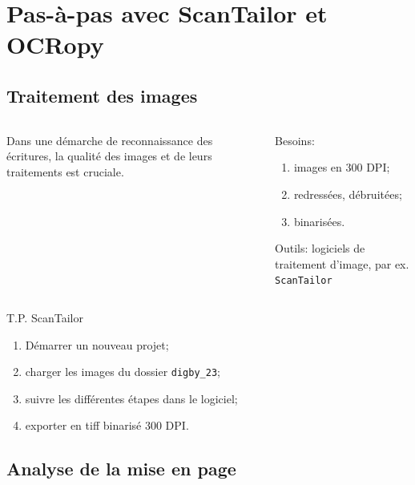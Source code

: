 \documentclass[ignorenonframetext]{beamer}
\begin{document}
\section{Pas-à-pas avec ScanTailor et OCRopy}

\subsection{Traitement des images}

\begin{frame}{}
\begin{columns}
\begin{column}{0.45\textwidth}
Dans une démarche de reconnaissance des écritures, la qualité des images
et de leurs traitements est cruciale.
\end{column}
\begin{column}{0.45\textwidth}
Besoins:
\begin{enumerate}
\item images en 300 DPI;
\item redressées, débruitées;
\item binarisées.
\end{enumerate}
Outils: logiciels de traitement d'image, par ex. \texttt{ScanTailor}
\end{column}
\end{columns}

\end{frame}

\begin{frame}{T.P. ScanTailor}

\begin{enumerate}
\item Démarrer un nouveau projet;
\item charger les images du dossier \texttt{digby\_23};
\item suivre les différentes étapes dans le logiciel;
\item exporter en tiff binarisé 300 DPI.
\end{enumerate}

\end{frame}

\subsection{Analyse de la mise en page}
\end{document}
